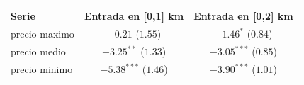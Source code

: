 \begin{tabular}{lcc}
\toprule
Serie & Entrada en [0,1] km & Entrada en [0,2] km \\
\midrule
precio maximo & $-0.21$ ($1.55$) & $-1.46^{*}$ ($0.84$) \\
precio medio & $-3.25^{**}$ ($1.33$) & $-3.05^{***}$ ($0.85$) \\
precio minimo & $-5.38^{***}$ ($1.46$) & $-3.90^{***}$ ($1.01$) \\
\bottomrule
\end{tabular}
